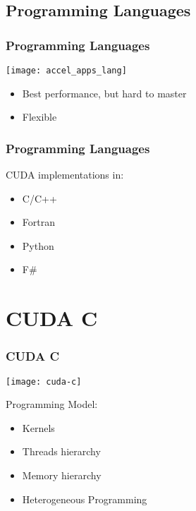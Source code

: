 \documentclass[10pt, compress]{beamer}
\begin{document}
\subsection{Programming Languages}

\begin{frame}
    \frametitle{Programming Languages}
    \begin{center}
        \texttt{[image: accel\_apps\_lang]}
    \end{center}


    \begin{itemize}
        \item Best performance, but hard to master

        \item Flexible
    \end{itemize}
\end{frame}

\begin{frame}
    \frametitle{Programming Languages}
    CUDA implementations in:
    \begin{itemize}
        \item \alert{C/C++}
        \item Fortran
        \item Python
        \item F\#
    \end{itemize}
\end{frame}

\section{CUDA C}

\begin{frame}
    \frametitle{CUDA C}
    \begin{center}
        \texttt{[image: cuda-c]}
    \end{center}


    Programming Model:

    \begin{itemize}
        \item \alert{Kernels}

        \item \alert{Threads} hierarchy

        \item \alert{Memory} hierarchy

        \item \alert{Heterogeneous} Programming
    \end{itemize}
\end{frame}
\end{document}
